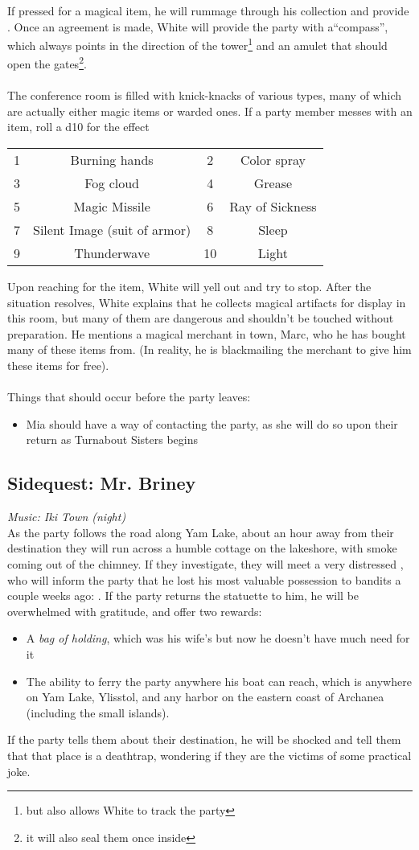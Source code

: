 If pressed for a magical item, he will rummage through his collection and provide . Once an agreement is made, White will provide the party with a``compass'', which always points in the direction of the tower\footnote{but also allows White to track the party} and an amulet that should open the gates\footnote{it will also seal them once inside}. \\
\\
The conference room is filled with knick-knacks of various types, many of which are actually either magic items or warded ones. If a party member messes with an item, roll a d10 for the effect
\begin{tabular}{c c|c c}
1 & Burning hands & 2 & Color spray \\
3 & Fog cloud & 4 & Grease \\
5 & Magic Missile & 6 & Ray of Sickness \\
7 & Silent Image (suit of armor) & 8 & Sleep \\
9 & Thunderwave & 10 & Light \end{tabular}
Upon reaching for the item, White will yell out and try to stop. After the situation resolves, White explains that he collects magical artifacts for display in this room, but many of them are dangerous and shouldn't be touched without preparation. He mentions a magical merchant in town, Marc, who he has bought many of these items from. (In reality, he is blackmailing the merchant to give him these items for free).\\
\\
Things that should occur before the party leaves:
\begin{itemize}
\item Mia should have a way of contacting the party, as she will do so upon their return as Turnabout Sisters begins
\end{itemize}
\subsection{Sidequest: Mr. Briney}
\textit{Music: Iki Town (night)}\\
As the party follows the road along Yam Lake, about an hour away from their destination they will run across a humble cottage on the lakeshore, with smoke coming out of the chimney. If they investigate, they will meet a very distressed , who will inform the party that he lost his most valuable possession to bandits a couple weeks ago: . If the party returns the statuette to him, he will be overwhelmed with gratitude, and offer two rewards:
\begin{itemize}
\item A \textit{bag of holding}, which was his wife's but now he doesn't have much need for it
\item The ability to ferry the party anywhere his boat can reach, which is anywhere on Yam Lake, Ylisstol, and any harbor on the eastern coast of Archanea (including the small islands).
\end{itemize}
If the party tells them about their destination, he will be shocked and tell them that that place is a deathtrap, wondering if they are the victims of some practical joke.
